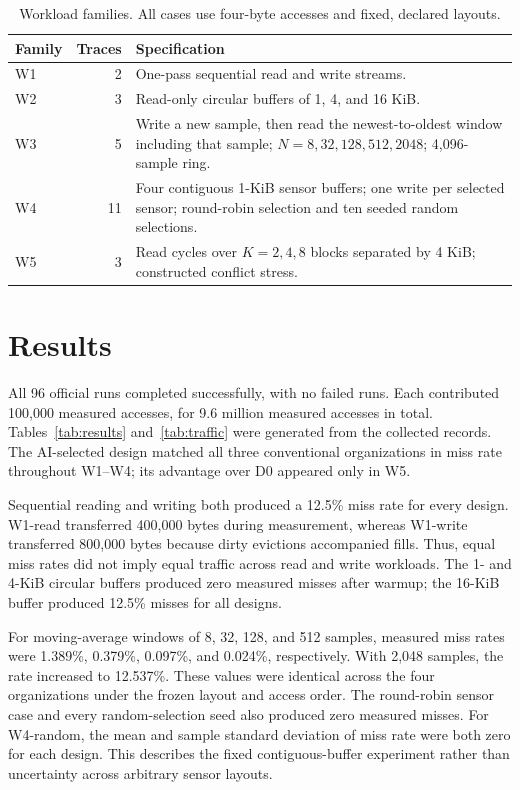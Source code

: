 \documentclass[11pt,a4paper]{article}
\begin{document}
\begin{table}[htbp]\centering\small
\caption{Workload families. All cases use four-byte accesses and fixed, declared layouts.}\label{tab:workloads}
\begin{tabularx}{\linewidth}{l r Y}\toprule
Family & Traces & Specification\\\midrule
W1 & 2 & One-pass sequential read and write streams.\\
W2 & 3 & Read-only circular buffers of 1, 4, and 16 KiB.\\
W3 & 5 & Write a new sample, then read the newest-to-oldest window including that sample; $N=8,32,128,512,2048$; 4,096-sample ring.\\
W4 & 11 & Four contiguous 1-KiB sensor buffers; one write per selected sensor; round-robin selection and ten seeded random selections.\\
W5 & 3 & Read cycles over $K=2,4,8$ blocks separated by 4 KiB; constructed conflict stress.\\\bottomrule
\end{tabularx}
\end{table}

\section{Results}
All 96 official runs completed successfully, with no failed runs. Each contributed 100,000 measured accesses, for 9.6 million measured accesses in total. Tables~\ref{tab:results} and~\ref{tab:traffic} were generated from the collected records. The AI-selected design matched all three conventional organizations in miss rate throughout W1--W4; its advantage over D0 appeared only in W5.

Sequential reading and writing both produced a 12.5\% miss rate for every design. W1-read transferred 400,000 bytes during measurement, whereas W1-write transferred 800,000 bytes because dirty evictions accompanied fills. Thus, equal miss rates did not imply equal traffic across read and write workloads. The 1- and 4-KiB circular buffers produced zero measured misses after warmup; the 16-KiB buffer produced 12.5\% misses for all designs.

For moving-average windows of 8, 32, 128, and 512 samples, measured miss rates were 1.389\%, 0.379\%, 0.097\%, and 0.024\%, respectively. With 2,048 samples, the rate increased to 12.537\%. These values were identical across the four organizations under the frozen layout and access order. The round-robin sensor case and every random-selection seed also produced zero measured misses. For W4-random, the mean and sample standard deviation of miss rate were both zero for each design. This describes the fixed contiguous-buffer experiment rather than uncertainty across arbitrary sensor layouts.
\end{document}
